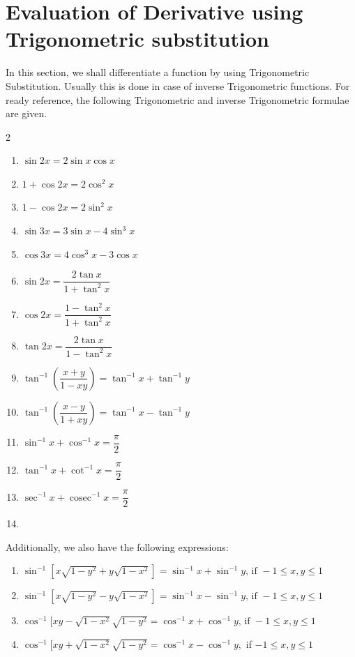 \documentclass[../../main.tex]{subfiles}
\DeclareMathOperator{\cosec}{cosec}
\theoremstyle{definition}
\begin{document}
\section{Evaluation of Derivative using Trigonometric substitution}


In this section, we shall differentiate a function by using Trigonometric Substitution. Usually this is done in case of inverse Trigonometric functions. For ready reference, the following Trigonometric and inverse Trigonometric formulae are given.

\begin{multicols}{2}
\begin{enumerate}[label=(\roman*)]
    \item $\sin 2x=2\sin x\cos x$
    \item $1+\cos 2x=2\cos^2x$
    \item $1-\cos 2x=2\sin^2 x$   
    \item $\sin 3x=3\sin x-4\sin^3 x$
    \item $\cos 3x=4\cos^3 x-3\cos x$
    \item $\sin 2x=\dfrac{2\tan x}{1+\tan^2 x}$
    \item $\cos 2x=\dfrac{1-\tan^2x}{1+\tan^2 x}$
    \item $\tan 2x=\dfrac{2\tan x}{1-\tan^2 x}$
    \item$\tan ^{-1}(\dfrac{x+y}{1-xy})=\tan^{-1}x+\tan^{-1}y$
    \item $\tan^{-1}(\dfrac{x-y}{1+xy})=\tan^{-1}x-\tan^{-1}y$
    \item $\sin^{-1}x+\cos^{-1}x=\dfrac{\pi}{2}$
    \item $\tan^{-1}x+\cot^{-1}x=\dfrac{\pi}{2}$
    \item $\sec^{-1}x+\cosec^{-1}x=\dfrac{\pi}{2}$
    \item[] \phantom{x}
\end{enumerate}
\end{multicols}

Additionally, we also have the following expressions:
\begin{enumerate}
    \item $\sin^{-1}[x\sqrt{1-y^2}+y\sqrt{1-x^2}] =\sin^{-1}x+\sin^{-1}y\text{, if }-1\leq x,y\leq 1$
    \item $\sin^{-1}[x\sqrt{1-y^2}-y\sqrt{1-x^2}] = \sin^{-1}x-\sin^{-1}y\text{, if }-1\leq x,y\leq 1$
    \item $\cos ^{-1}[xy-\sqrt{1-x^2}\sqrt{1-y^2}=\cos^{-1}x+\cos ^{-1}y\text{, if }-1\leq x,y\leq 1$
    \item $\cos ^{-1}[xy+\sqrt{1-x^2}\sqrt{1-y^2}=\cos^{-1}x-\cos ^{-1}y,$ if $-1\leq x,y\leq 1$
\end{enumerate}
 
\end{document}
